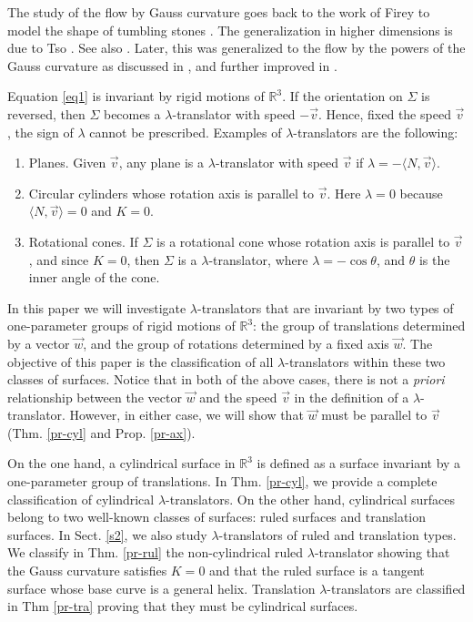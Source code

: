 \documentclass[12pt]{amsart}
\def\r{\mathbb R}
\theoremstyle{definition}
\begin{document}
The study of the flow by Gauss curvature  goes back to the work of Firey to model the shape of  tumbling stones \cite{fi}. The generalization in    higher dimensions is due to Tso \cite{ts}. See also \cite{an,an3,cdl,ccd,ur}. Later, this was   generalized to the flow by the powers of the Gauss curvature as discussed in \cite{ch,ur2,ur3}, and further improved in \cite{al,al2,chu,cdl,cdkl,cck,jbj}. 

Equation \eqref{eq1} is invariant by rigid motions of $\r^3$. If the orientation on $\Sigma$ is reversed, then $\Sigma$ becomes a $\lambda$-translator with speed $-\vec{v}$. Hence, fixed the speed $\vec{v}$, the sign of $\lambda$ cannot be prescribed. Examples of $\lambda$-translators are the following: 

\begin{enumerate}
\item Planes. Given $\vec{v}$, any plane is a $\lambda$-translator with speed $\vec{v}$ if $\lambda=-\langle N,\vec{v}\rangle$.
\item Circular cylinders whose rotation axis is parallel to $\vec{v}$. Here $\lambda=0$ because $\langle N,\vec{v}\rangle=0$ and $K=0$.
\item Rotational cones. If $\Sigma$ is a rotational cone whose rotation axis is parallel to $\vec{v}$, and since $K=0$, then $\Sigma$ is a $\lambda$-translator, where $\lambda=-\cos\theta$, and $\theta$ is the inner angle of the cone.
\end{enumerate}



In this paper we will investigate $\lambda$-translators that are invariant by two types of one-parameter groups of rigid motions of $\r^3$: the group of translations determined by a vector $\vec{w}$, and the group of rotations determined by a fixed axis $\vec{w}$. The objective of this paper is the classification of all $\lambda$-translators within these two classes of surfaces. Notice that in both of the above cases, there is not a {\it priori} relationship between the vector $\vec{w}$ and the speed $\vec{v}$ in the definition of a $\lambda$-translator. However, in either case, we will show that $\vec{w}$ must be parallel to $\vec{v}$ (Thm. \ref{pr-cyl} and Prop. \ref{pr-ax}).

On the one hand, a cylindrical surface in $\r^3$ is defined as a surface  invariant by a one-parameter group of translations. In Thm. \ref{pr-cyl}, we provide a complete classification of cylindrical $\lambda$-translators. On the other hand, cylindrical surfaces belong to two well-known classes of surfaces: ruled surfaces and translation surfaces. In Sect. \ref{s2}, we also study $\lambda$-translators of ruled and translation types. We classify in Thm. \ref{pr-rul} the  non-cylindrical ruled $\lambda$-translator  showing that the Gauss curvature satisfies $K=0$ and that the ruled surface is a tangent surface whose base curve is a general helix. Translation $\lambda$-translators are classified in   Thm \ref{pr-tra} proving that they must be   cylindrical surfaces.
\end{document}
